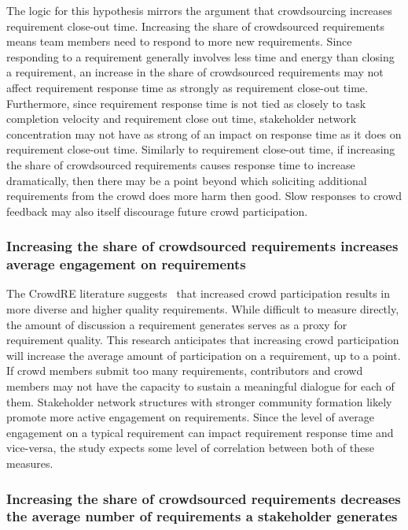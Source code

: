The logic for this hypothesis mirrors the argument that crowdsourcing increases requirement close-out time. Increasing the share of crowdsourced requirements means team members need to respond to more new requirements. Since responding to a requirement generally involves less time and energy than closing a requirement, an increase in the share of crowdsourced requirements may not affect requirement response time as strongly as requirement close-out time. Furthermore, since requirement response time is not tied as closely to task completion velocity and requirement close out time, stakeholder network concentration may not have as strong of an impact on response time as it does on requirement close-out time. Similarly to requirement close-out time, if increasing the share of crowdsourced requirements causes response time to increase dramatically, then there may be a point beyond which soliciting additional requirements from the crowd does more harm then good. Slow responses to crowd feedback may also itself discourage future crowd participation.

\subsubsection{Increasing the share of crowdsourced requirements increases average engagement on requirements}

The CrowdRE literature suggests~\cite{groen} that increased crowd participation results in more diverse and higher quality requirements. While difficult to measure directly, the amount of discussion a requirement generates serves as a proxy for requirement quality. This research anticipates that increasing crowd participation will increase the average amount of participation on a requirement, up to a point. If crowd members submit too many requirements, contributors and crowd members may not have the capacity to sustain a meaningful dialogue for each of them. Stakeholder network structures with stronger community formation likely promote more active engagement on requirements. Since the level of average engagement on a typical requirement can impact requirement response time and vice-versa, the study expects some level of correlation between both of these measures.


\subsubsection{Increasing the share of crowdsourced requirements decreases the average number of requirements a stakeholder generates}


